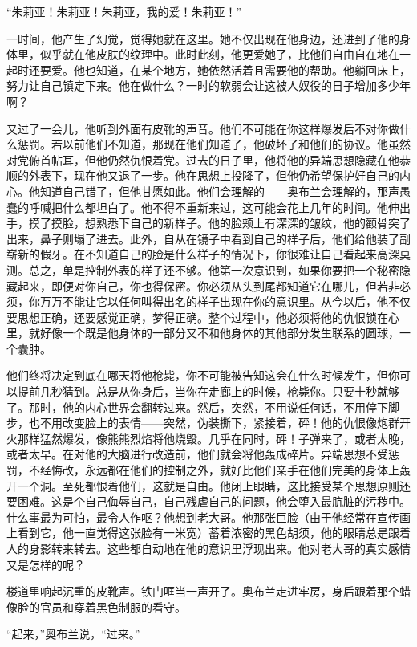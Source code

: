 ``朱莉亚！朱莉亚！朱莉亚，我的爱！朱莉亚！''

一时间，他产生了幻觉，觉得她就在这里。她不仅出现在他身边，还进到了他的身体里，似乎就在他皮肤的纹理中。此时此刻，他更爱她了，比他们自由自在地在一起时还要爱。他也知道，在某个地方，她依然活着且需要他的帮助。他躺回床上，努力让自己镇定下来。他在做什么？一时的软弱会让这被人奴役的日子增加多少年啊？

又过了一会儿，他听到外面有皮靴的声音。他们不可能在你这样爆发后不对你做什么惩罚。若以前他们不知道，那现在他们知道了，他破坏了和他们的协议。他虽然对党俯首帖耳，但他仍然仇恨着党。过去的日子里，他将他的异端思想隐藏在他恭顺的外表下，现在他又退了一步。他在思想上投降了，但他仍希望保护好自己的内心。他知道自己错了，但他甘愿如此。他们会理解的——奥布兰会理解的，那声愚蠢的呼喊把什么都坦白了。他不得不重新来过，这可能会花上几年的时间。他伸出手，摸了摸脸，想熟悉下自己的新样子。他的脸颊上有深深的皱纹，他的颧骨突了出来，鼻子则塌了进去。此外，自从在镜子中看到自己的样子后，他们给他装了副崭新的假牙。在不知道自己的脸是什么样子的情况下，你很难让自己看起来高深莫测。总之，单是控制外表的样子还不够。他第一次意识到，如果你要把一个秘密隐藏起来，即便对你自己，你也得保密。你必须从头到尾都知道它在哪儿，但若非必须，你万万不能让它以任何叫得出名的样子出现在你的意识里。从今以后，他不仅要思想正确，还要感觉正确，梦得正确。整个过程中，他必须将他的仇恨锁在心里，就好像一个既是他身体的一部分又不和他身体的其他部分发生联系的圆球，一个囊肿。

他们终将决定到底在哪天将他枪毙，你不可能被告知这会在什么时候发生，但你可以提前几秒猜到。总是从你身后，当你在走廊上的时候，枪毙你。只要十秒就够了。那时，他的内心世界会翻转过来。然后，突然，不用说任何话，不用停下脚步，也不用改变脸上的表情——突然，伪装撕下，紧接着，砰！他的仇恨像炮群开火那样猛然爆发，像熊熊烈焰将他烧毁。几乎在同时，砰！子弹来了，或者太晚，或者太早。在对他的大脑进行改造前，他们就会将他轰成碎片。异端思想不受惩罚，不经悔改，永远都在他们的控制之外，就好比他们亲手在他们完美的身体上轰开一个洞。至死都恨着他们，这就是自由。他闭上眼睛，这比接受某个思想原则还要困难。这是个自己侮辱自己，自己残虐自己的问题，他会堕入最肮脏的污秽中。什么事最为可怕，最令人作呕？他想到老大哥。他那张巨脸（由于他经常在宣传画上看到它，他一直觉得这张脸有一米宽）蓄着浓密的黑色胡须，他的眼睛总是跟着人的身影转来转去。这些都自动地在他的意识里浮现出来。他对老大哥的真实感情又是怎样的呢？

楼道里响起沉重的皮靴声。铁门哐当一声开了。奥布兰走进牢房，身后跟着那个蜡像脸的官员和穿着黑色制服的看守。

``起来，''奥布兰说，``过来。''

